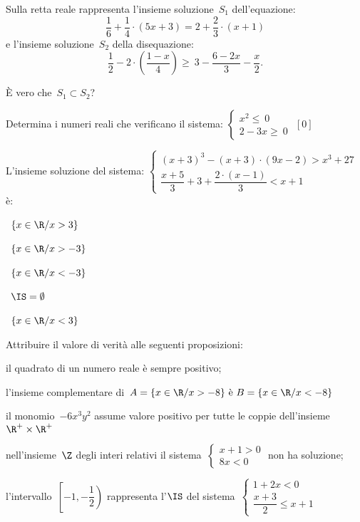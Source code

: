\begin{esercizio}
 \label{ese:21.33}
Sulla retta reale rappresenta l'insieme soluzione~\(S_{1}\)
dell'equazione:
\[\dfrac{1}{6}+\dfrac{1}{4}\cdot (5x+3)=2+\dfrac{2}{3}\cdot (x+1)\]
e l'insieme soluzione~\(S_{2}\) della disequazione:
\[\dfrac{1}{2}-2\cdot\left(\dfrac{1-x}{4}\right)\ge
~3-\dfrac{6-2x}{3}-\dfrac{x}{2}.\]

È vero che~\(S_{1}\subset S_{2}\)?
\end{esercizio}

\begin{esercizio}[\Ast]
 \label{ese:21.34}
 Determina i numeri reali che verificano il sistema:
 \(\left\{%
  \begin{array}{l}
  x^{2}\le~0
  \\2-3x\ge~0
 \end{array}\right.\)
 \hfill \(\left[0\right]\)
 \end{esercizio}

\begin{esercizio}
 \label{ese:21.35}
 L'insieme soluzione del sistema:
\(\left\{\begin{array}{l}
  (x+3)^{3}-(x+3)\cdot (9x-2)>x^{3}+27\\
  \dfrac{x+5}{3}+3+\dfrac{2\cdot (x-1)}{3}<x+1
 \end{array}\right.\) è:
\begin{multicols}{2}
\boxA\quad~\(\left\{x\in \R/x>3\right\}\)

\boxB\quad~\(\left\{x\in \R/x>-3\right\}\)

\boxC\quad~\(\left\{x\in \R/x<-3\right\}\)

\boxD\quad~\(\IS=\emptyset \)

\boxE\quad~\(\left\{x\in\R/x<3\right\}\)
\end{multicols}

\end{esercizio}

\begin{esercizio}
 \label{ese:21.36}
 Attribuire il valore di verità alle seguenti proposizioni:

\begin{enumeratea}
\item il quadrato di un numero reale è sempre positivo;
\item l'insieme complementare di~\(A=\{x\in\R/x>-8\}\text{ è 
}B=\{x\in\R/x<-8\}\)
\item il monomio~\(-6x^{3}y^{2}\) assume valore positivo per tutte le coppie 
dell'insieme~\(\R^{+}\times\R^{+}\)
\item nell'insieme~\(\Z\) degli interi relativi il 
sistema~\(\left\{\begin{array}{l}x+1>0\\8x<0\end{array}\right.\) non ha 
soluzione;
\item l'intervallo~\(\left[-1,\left.-{\dfrac{1}{2}}\right)\right.\) 
rappresenta 
l'\(\IS\) del sistema~\(\left\{\begin{array}{l}1+2x<0 \\\dfrac{x+3}{2}\le 
x+1\end{array}\right.\)
\end{enumeratea}
\end{esercizio}

